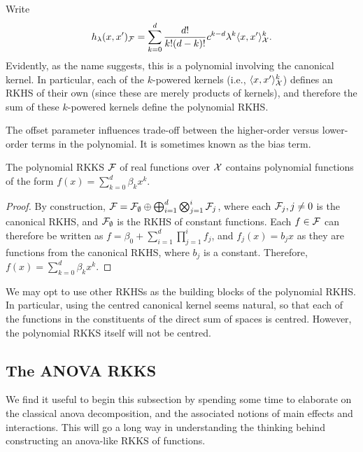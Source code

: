 Write
\begin{align*}
  h_\lambda(x,x')_{\mathcal F} = \sum_{k=0}^d \frac{d!}{k!(d-k)!} c^{k-d} \lambda^k \langle x,x'\rangle_{\mathcal X}^k.
\end{align*}
Evidently, as the name suggests, this is a polynomial involving the canonical kernel.
In particular, each of the $k$-powered kernels (i.e., $\langle x,x'\rangle_{\mathcal X}^k$) defines an RKHS of their own (since these are merely products of kernels), and therefore the sum of these $k$-powered kernels define the polynomial RKHS.

The offset parameter influences trade-off between the higher-order versus lower-order terms in the polynomial.
It is sometimes known as the bias term.

\begin{proposition}
  The polynomial RKKS ${\mathcal F}$ of real functions over ${\mathcal X}$ contains polynomial functions of the form $f(x)=\sum_{k=0}^d \beta_k x^k$.
\end{proposition}

\begin{proof}
  By construction, ${\mathcal F} = {\mathcal F}_\emptyset \oplus \bigoplus_{i=1}^d\bigotimes_{j=1}^i {\mathcal F}_j$, where each ${\mathcal F}_j, j \neq 0$ is the canonical RKHS, and ${\mathcal F}_\emptyset$ is the RKHS of constant functions.
  Each $f \in {\mathcal F}$ can therefore be written as $f = \beta_0 + \sum_{i=1}^d\prod_{j=1}^i f_j$, and $f_j(x)= b_j x$ as they are functions from the canonical RKHS, where $b_j$ is a constant.
  Therefore, $f(x) = \sum_{k=0}^d \beta_k x^k$.
\end{proof}

\begin{remark}
  We may opt to use other RKHSs as the building blocks of the polynomial RKHS.
  In particular, using the centred canonical kernel seems natural, so that each of the functions in the constituents of the direct sum of spaces is centred.
  However, the polynomial RKKS itself will not be centred.
\end{remark}

\subsection{The ANOVA RKKS}
\label{sec:anovarkks}

We find it useful to begin this subsection by spending some time to elaborate on the classical \gls*{anova} decomposition, and the associated notions of main effects and interactions.
This will go a long way in understanding the thinking behind constructing an \gls*{anova}-like RKKS of functions.

